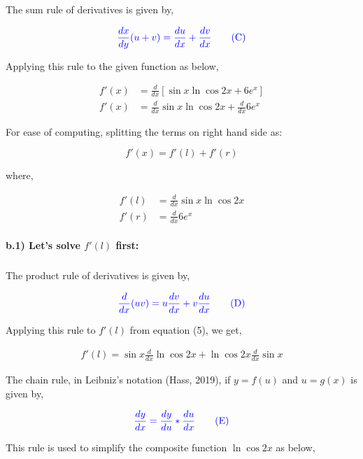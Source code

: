 \documentclass[a4paper]{report}
\begin{document}
The sum rule of derivatives is given by,

\begin{equation*}
    \color{blue} \frac{dx}{dy}({u+v}) = \frac{du}{dx}+\frac{dv}{dx} \tag{C}
\end{equation*}

Applying this rule to the given function as below,

\begin{align*}
     f'(x)&=\frac{d}{dx}[\sin x \ln \cos 2x+6{e^x}] \\
     f'(x)&=\frac{d}{dx}\sin x \ln \cos 2x + \frac{d}{dx}6{e^x}
\end{align*}

For ease of computing, splitting the terms on right hand side as:

$$f'(x)=f'(l)+f'(r)$$


where,

\begin{align}
    f'(l)&=\frac{d}{dx}\sin x \ln \cos 2x \\
    f'(r)&=\frac{d}{dx}6{e^x}
\end{align}

\paragraph{b.1) Let's solve $f'(l)$ first:}

\subparagraph{}


The product rule of derivatives is given by,

\begin{equation*}
    \color{blue} \frac{d}{dx}({uv}) = u\frac{dv}{dx}+v\frac{du}{dx} \tag{D}
\end{equation*}

Applying this rule to $f'(l)$ from equation (5), we get,

\begin{align*}
    f'(l)=\sin x \frac{d}{dx}\ln \cos 2x + \ln \cos 2x \frac{d}{dx} \sin x
\end{align*}

The chain rule, in Leibniz's notation (Hass, 2019), if $y=f(u)$  and $u=g(x)$ is given by,

\begin{equation*}
    \color{blue} \frac{dy}{dx}=\frac{dy}{du}*\frac{du}{dx} \tag{E}
\end{equation*}

This rule is used to simplify the composite function $\ln \cos 2x$ as below,
\end{document}
